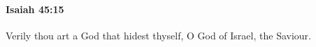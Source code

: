 
		\paragraph{Isaiah 45:15} %
			\label{ISAIAH-45-15}

			Verily thou art a God that hidest thyself, O God of Israel, the Saviour.


